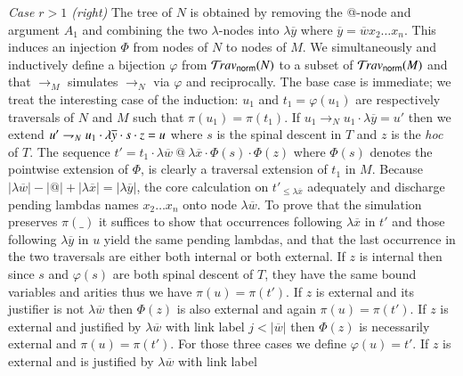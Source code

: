 \documentclass{elsarticle}
\theoremstyle{plain}
\theoremstyle{definition}
\newcommand{\normalizing}{{\sf norm}}
\def\coresymbol{\pi} %
\newcommand{\core}[1]{\coresymbol(#1)} %
\begin{document}
\emph{Case $r>1$ (right)} The tree of $N$ is obtained by removing the @-node and argument $A_1$ and combining the two $\lambda$-nodes into $\lambda\overline{y}$ where $\overline{y} = \overline{w} x_2 \ldots x_n$.
%
This induces an injection $\Phi$ from nodes of $N$ to nodes of $M$.
%
We simultaneously and inductively define
a bijection $\varphi$ from $\travset_\normalizing(N)$ to a subset of $\travset_\normalizing(M)$ and that $\rightarrow_M$ simulates $\rightarrow_N$ via $\varphi$ and reciprocally.
The base case is immediate; we treat the interesting case of the induction:
$u_1$ and $t_1=\varphi(u_1)$ are respectively traversals of $N$ and $M$ such that $\core{u_1} = \core{t_1}$.
If $u_1 \rightarrow_N u_1 \cdot \lambda\overline{y} = u'$ then we extend
$u' \rightharpoondown_N u_1 \cdot \lambda\overline{y} \cdot s \cdot z = u$ where $s$ is the spinal descent in $T$ and $z$ is the \emph{hoc} of $T$.
The sequence $t' = t_1 \cdot \lambda\overline{w} ~ @ ~ \lambda\overline{x} \cdot \Phi(s) \cdot \Phi(z)$
where $\Phi(s)$ denotes the pointwise extension of $\Phi$, is clearly a traversal extension of $t_1$ in $M$.
%
Because
$|\lambda\overline{w}| - |@| + |\lambda\overline{x}|
=|\lambda\overline{y}|
$, the core calculation
on $t'_{\leq \lambda\overline{x}}$ adequately
 and discharge pending lambdas names $x_2 \ldots x_n$
  onto node $\lambda\overline{w}$. To prove
that the simulation preserves $\core{\_}$
it suffices to show that occurrences following
$\lambda\overline{x}$ in $t'$ and those following $\lambda\overline{y}$ in $u$ yield the same pending lambdas, and that the last occurrence in the two traversals are either both internal or both external.
%
If $z$ is internal then since $s$ and $\varphi(s)$ are both  spinal descent of $T$, they have the same bound variables and arities thus we have $\core{u} = \core{t'}$.
If $z$ is external and its justifier is not $\lambda\overline{w}$ then
$\Phi(z)$ is also external and again $\core{u} = \core{t'}$.
If $z$ is external and justified by $\lambda\overline{w}$ with link label
$j<|\overline{w}|$ then $\Phi(z)$ is necessarily external and $\core{u} = \core{t'}$.
For those three cases we define $\varphi(u) = t'$.
%
If $z$ is external and is justified by $\lambda\overline{w}$ with link label
\end{document}
